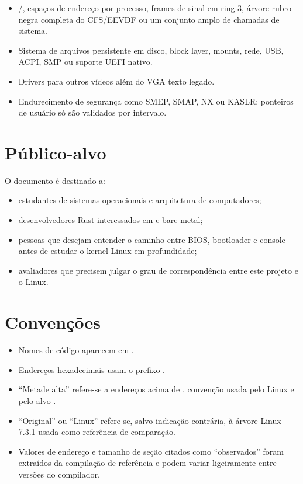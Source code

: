 \begin{itemize}
  \item {}/, espa\c{c}os de endere\c{c}o por processo,
        frames de sinal em ring 3, \'arvore rubro-negra completa do CFS/EEVDF
        ou um conjunto amplo de chamadas de sistema.
  \item Sistema de arquivos persistente em disco, block layer, mounts, rede,
        USB, ACPI, SMP ou suporte UEFI nativo.
  \item Drivers para outros v\'ideos al\'em do VGA texto legado.
  \item Endurecimento de seguran\c{c}a como SMEP, SMAP, NX ou KASLR;
        ponteiros de usu\'ario s\'o s\~ao validados por intervalo.
\end{itemize}

\section{P\'ublico-alvo}

O documento \'e destinado a:

\begin{itemize}
  \item estudantes de sistemas operacionais e arquitetura de computadores;
  \item desenvolvedores Rust interessados em  e bare metal;
  \item pessoas que desejam entender o caminho entre BIOS, bootloader e
        console antes de estudar o kernel Linux em profundidade;
  \item avaliadores que precisem julgar o grau de correspond\^encia entre
        este projeto e o Linux.
\end{itemize}

\section{Conven\c{c}\~oes}

\begin{itemize}
  \item Nomes de c\'odigo aparecem em .
  \item Endere\c{c}os hexadecimais usam o prefixo .
  \item ``Metade alta'' refere-se a endere\c{c}os acima de
        , conven\c{c}\~ao usada pelo Linux e pelo
        alvo .
  \item ``Original'' ou ``Linux'' refere-se, salvo indica\c{c}\~ao contr\'aria,
        \`a \'arvore Linux 7.3.1 usada como refer\^encia de compara\c{c}\~ao.
  \item Valores de endere\c{c}o e tamanho de se\c{c}\~ao citados como
        ``observados'' foram extra\'idos da compila\c{c}\~ao de refer\^encia e
        podem variar ligeiramente entre vers\~oes do compilador.
\end{itemize}

